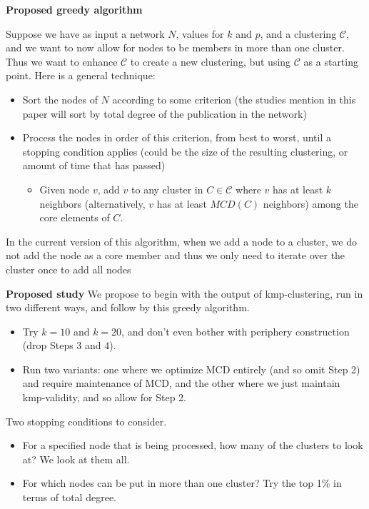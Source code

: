 \documentclass{article}
\begin{document}
\textbf{Proposed greedy algorithm}

Suppose we have as input a network $N$, values for $k$ and $p$, and a clustering $\mathcal{C}$, and we want to now allow for nodes to be members in more than one cluster.  Thus we want to enhance $\mathcal{C}$ to create a new clustering, but using $\mathcal{C}$ as a starting point.
Here is a general technique:

\begin{itemize}
	\item Sort the nodes of $N$ according to some criterion (the studies mention in this paper will sort by total degree of the publication in the network)
	\item Process the nodes in order of this criterion, from best to worst, until a stopping condition applies (could be the size of the resulting clustering, or amount of time that has passed)
	\begin{itemize}
		\item Given node $v$, add $v$ to any cluster in $C \in \mathcal{C}$ where $v$ has at least $k$ neighbors (alternatively, 
		$v$ has at least $MCD(C)$ neighbors) among the core elements of $C$.
	\end{itemize}
\end{itemize}

In the current version of this algorithm, when we add a node to a cluster, we do not add the node as a core member and thus we only need to iterate over the cluster once to add all nodes


\textbf{Proposed study}
We propose to begin with the output of kmp-clustering, run in two different ways, and follow by this greedy algorithm.

\begin{itemize}
	\item Try $k=10$ and $k=20$, and don't even bother with periphery construction (drop Steps 3 and 4).
	\item Run two variants: one where we optimize MCD entirely (and so omit Step 2) and require maintenance of MCD, and the other where we just maintain kmp-validity, and so allow for Step 2.
	
\end{itemize}

Two stopping conditions to consider.
\begin{itemize}
	\item For a specified node that is being processed, how many of the clusters to look at? We look at them all.
	\item For which nodes can be put in more than one cluster?  Try the top 1\% in terms of total degree. 
\end{itemize}
\end{document}
